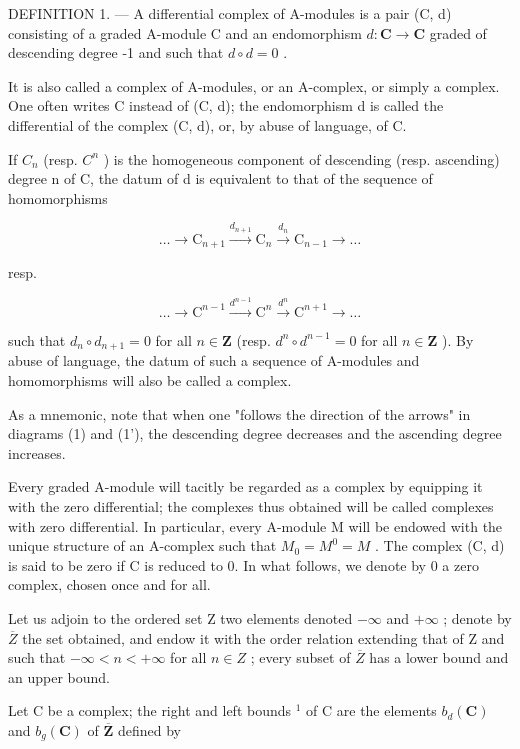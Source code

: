 DEFINITION 1. --- A differential complex of A-modules is a pair (C, d) consisting of a graded A-module C and an endomorphism \(d: \mathbf{C} \to \mathbf{C}\) graded of descending degree -1 and such that \(d \circ d = 0\) .

It is also called a complex of A-modules, or an A-complex, or simply a complex. One often writes C instead of (C, d); the endomorphism d is called the differential of the complex (C, d), or, by abuse of language, of C.

If \(C_{n}\) (resp. \(C^{n}\) ) is the homogeneous component of descending (resp. ascending) degree n of C, the datum of d is equivalent to that of the sequence of homomorphisms

\[
\dots \longrightarrow \mathrm{C} _ {n + 1} \xrightarrow {d _ {n + 1}} \mathrm{C} _ {n} \xrightarrow {d _ {n}} \mathrm{C} _ {n - 1} \longrightarrow \dots\tag{1}
\]

resp.

\[
\dots \longrightarrow \mathrm{C} ^ {n - 1} \xrightarrow {d ^ {n - 1}} \mathrm{C} ^ {n} \xrightarrow {d ^ {n}} \mathrm{C} ^ {n + 1} \longrightarrow \dots\tag{1'}
\]

such that \(d_n \circ d_{n+1} = 0\) for all \(n \in \mathbf{Z}\) (resp. \(d^n \circ d^{n-1} = 0\) for all \(n \in \mathbf{Z}\) ). By abuse of language, the datum of such a sequence of A-modules and homomorphisms will also be called a complex.

As a mnemonic, note that when one "follows the direction of the arrows" in diagrams (1) and (1'), the descending degree decreases and the ascending degree increases.

Every graded A-module will tacitly be regarded as a complex by equipping it with the zero differential; the complexes thus obtained will be called complexes with zero differential. In particular, every A-module M will be endowed with the unique structure of an A-complex such that \(M_{0} = M^{0} = M\) . The complex (C, d) is said to be zero if C is reduced to 0. In what follows, we denote by 0 a zero complex, chosen once and for all.

Let us adjoin to the ordered set Z two elements denoted \(-\infty\) and \(+\infty\) ; denote by \(\overline{Z}\) the set obtained, and endow it with the order relation extending that of Z and such that \(-\infty < n < +\infty\) for all \(n \in Z\) ; every subset of \(\overline{Z}\) has a lower bound and an upper bound.

Let C be a complex; the right and left bounds \(^{1}\) of C are the elements \(b_{d}(\mathbf{C})\) and \(b_{g}(\mathbf{C})\) of \(\overline{\mathbf{Z}}\) defined by

